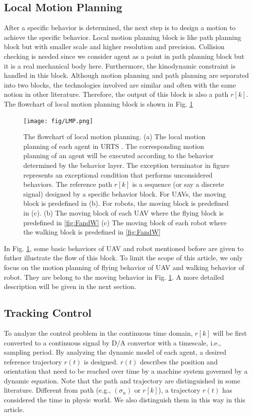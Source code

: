 \documentclass{ieeeaccess}
\begin{document}
\subsection{Local Motion Planning}
After a specific behavior is determined, the next step is to design a motion to achieve the specific behavior. Local motion planning block is like path planning block but with smaller scale and higher resolution and precision. Collision checking is needed since we consider agent as a point in path planning block but it is a real mechanical body here. Furthermore, the kinodynamic constraint is handled in this block. Although motion planning and path planning are separated into two blocks, the technologies involved are similar and often with the same notion in other literature. Therefore, the output of this block is also a path $r[k]$. The flowchart of local motion planning block is shown in Fig. \ref{fig:LMP}
\begin{figure}[htbp]
    \centering
    \texttt{[image: fig/LMP.png]}\caption{The flowchart of local motion planning. (a) The local motion planning of each agent in URTS . The corresponding motion planning of an agent will be executed according to the behavior determined by the behavior layer. The exception terminator in figure represents an exceptional condition that performs unconsidered behaviors. The reference path $r[k]$ is a sequence (or say a discrete signal) designed by a specific behavior block. For UAVs, the moving block is predefined in (b). For robots, the moving block is predefined in (c). (b) The moving block of each UAV where the flying block is predefined in \ref{fig:FandW} (c) The moving block of each robot where the walking block is predefined in \ref{fig:FandW}}
    \label{fig:LMP}
\end{figure}

In Fig. \ref{fig:LMP}, some basic behaviors of UAV and robot mentioned before are given to futher illustrate the flow of this block. To limit the scope of this article, we only focus on the motion planning of flying behavior of UAV and walking behavior of robot. They are belong to the moving behavior in Fig. \ref{fig:LMP}. A more detailed description will be given in the next section.

\subsection{Tracking Control}
To analyze the control problem in the continuous time domain, $r[k]$ will be first converted to a continuous signal by D/A convertor with a timescale, i.e., sampling period. By analyzing the dynamic model of each agent, a desired reference trajectory $r(t)$ is designed. $r(t)$ describes the position and orientation that need to be reached over time by a machine system governed by a dynamic equation. Note that the path and trajectory are distinguished in some literature. Different from path (e.g., $(\sigma_n)$ or $r[k]$), a trajectory $r(t)$ has considered the time in physic world. We also distinguish them in this way in this article.
\end{document}
